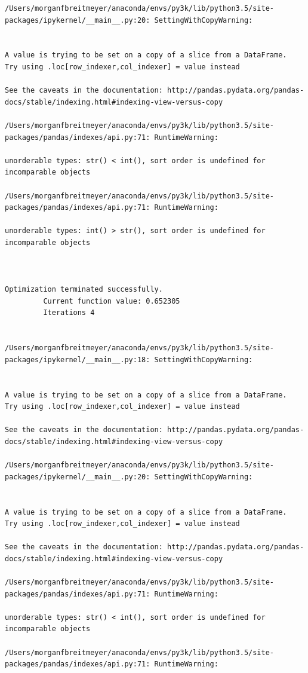 \begin{lstlisting}
/Users/morganfbreitmeyer/anaconda/envs/py3k/lib/python3.5/site-packages/ipykernel/__main__.py:20: SettingWithCopyWarning:


A value is trying to be set on a copy of a slice from a DataFrame.
Try using .loc[row_indexer,col_indexer] = value instead

See the caveats in the documentation: http://pandas.pydata.org/pandas-docs/stable/indexing.html#indexing-view-versus-copy

/Users/morganfbreitmeyer/anaconda/envs/py3k/lib/python3.5/site-packages/pandas/indexes/api.py:71: RuntimeWarning:

unorderable types: str() < int(), sort order is undefined for incomparable objects

/Users/morganfbreitmeyer/anaconda/envs/py3k/lib/python3.5/site-packages/pandas/indexes/api.py:71: RuntimeWarning:

unorderable types: int() > str(), sort order is undefined for incomparable objects



Optimization terminated successfully.
         Current function value: 0.652305
         Iterations 4


/Users/morganfbreitmeyer/anaconda/envs/py3k/lib/python3.5/site-packages/ipykernel/__main__.py:18: SettingWithCopyWarning:


A value is trying to be set on a copy of a slice from a DataFrame.
Try using .loc[row_indexer,col_indexer] = value instead

See the caveats in the documentation: http://pandas.pydata.org/pandas-docs/stable/indexing.html#indexing-view-versus-copy

/Users/morganfbreitmeyer/anaconda/envs/py3k/lib/python3.5/site-packages/ipykernel/__main__.py:20: SettingWithCopyWarning:


A value is trying to be set on a copy of a slice from a DataFrame.
Try using .loc[row_indexer,col_indexer] = value instead

See the caveats in the documentation: http://pandas.pydata.org/pandas-docs/stable/indexing.html#indexing-view-versus-copy

/Users/morganfbreitmeyer/anaconda/envs/py3k/lib/python3.5/site-packages/pandas/indexes/api.py:71: RuntimeWarning:

unorderable types: str() < int(), sort order is undefined for incomparable objects

/Users/morganfbreitmeyer/anaconda/envs/py3k/lib/python3.5/site-packages/pandas/indexes/api.py:71: RuntimeWarning:


\end{lstlisting}
